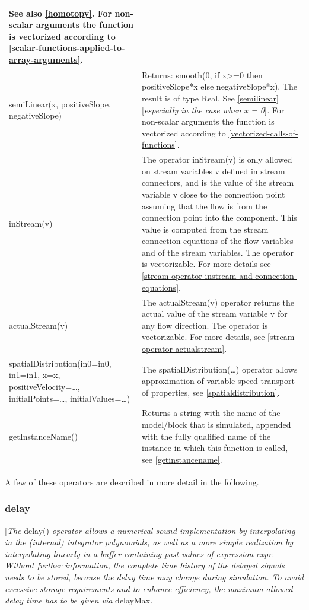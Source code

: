 \documentclass[10pt,a4paper]{report}
\def\doublelabel#1{\label{#1}\hypertarget{#1}{}}
\begin{document}
\begin{longtable}{|p{5cm}|p{8cm}|}
See also \ref{homotopy}. For non-scalar arguments the function is
vectorized according to \ref{scalar-functions-applied-to-array-arguments}.\\ \hline
semiLinear(x,
positiveSlope,
negativeSlope) & 
Returns:
smooth(0, if x\textgreater{}=0 then positiveSlope*x else
negativeSlope*x).
The result is of type Real. See \ref{semilinear} {[}\emph{especially in
the case when x = 0}{]}\emph{.} For non-scalar arguments the function is
vectorized according to \ref{vectorized-calls-of-functions}.\\ \hline
inStream(v) & The operator inStream(v) is only allowed on stream
variables v defined in stream connectors, and is the value of the stream
variable v close to the connection point assuming that the flow is from
the connection point into the component. This value is computed from the
stream connection equations of the flow variables and of the stream
variables. The operator is vectorizable. For more details see \ref{stream-operator-instream-and-connection-equations}.\\ \hline
actualStream(v) & The actualStream(v) operator returns the actual value
of the stream variable v for any flow direction. The operator is
vectorizable. For more details, see \ref{stream-operator-actualstream}.\\ \hline
spatialDistribution(in0=in0, in1=in1,
x=x,\newline
positiveVelocity=\ldots{},\newline
initialPoints=\ldots{},\newline
initialValues=\ldots{}) & 
The spatialDistribution(\ldots{}) operator allows approximation of
variable-speed transport of properties, see \ref{spatialdistribution}.\\ \hline
getInstanceName() & Returns a string with the name of the model/block
that is simulated, appended with the fully qualified name of the
instance in which this function is called, see \ref{getinstancename}.\\ \hline
\end{longtable}

A few of these operators are described in more detail in the following.

\subsubsection{delay}\doublelabel{delay}

{[}\emph{The} delay() \emph{operator allows a numerical sound
implementation by interpolating in the (internal) integrator
polynomials, as well as a more simple realization by interpolating
linearly in a buffer containing past values of expression expr. Without
further information, the complete time history of the delayed signals
needs to be stored, because the delay time may change during simulation.
To avoid excessive storage requirements and to enhance efficiency, the
maximum allowed delay time has to be given via} delayMax\emph{. }
\end{document}
